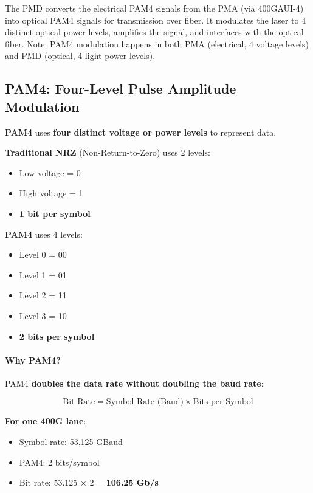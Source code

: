 \documentclass[openany]{tufte-book}
\begin{document}
The PMD converts the electrical PAM4 signals from the PMA (via 400GAUI-4) into optical PAM4 signals for transmission over fiber. It modulates the laser to 4 distinct optical power levels, amplifies the signal, and interfaces with the optical fiber. Note: PAM4 modulation happens in both PMA (electrical, 4 voltage levels) and PMD (optical, 4 light power levels).

\subsection{PAM4: Four-Level Pulse Amplitude Modulation}

\textbf{PAM4} uses \textbf{four distinct voltage or power levels} to represent data.

\textbf{Traditional NRZ} (Non-Return-to-Zero) uses 2 levels:
\begin{itemize}
\item Low voltage = 0
\item High voltage = 1
\item \textbf{1 bit per symbol}
\end{itemize}

\textbf{PAM4} uses 4 levels:
\begin{itemize}
\item Level 0 = 00
\item Level 1 = 01
\item Level 2 = 11  
\item Level 3 = 10
\item \textbf{2 bits per symbol}
\end{itemize}

\paragraph{Why PAM4?}

PAM4 \textbf{doubles the data rate without doubling the baud rate}:

\begin{equation}
\text{Bit Rate} = \text{Symbol Rate (Baud)} \times \text{Bits per Symbol}
\end{equation}

\textbf{For one 400G lane}:
\begin{itemize}
\item Symbol rate: 53.125 GBaud
\item PAM4: 2 bits/symbol
\item Bit rate: 53.125 × 2 = \textbf{106.25 Gb/s}
\end{itemize}
\end{document}
